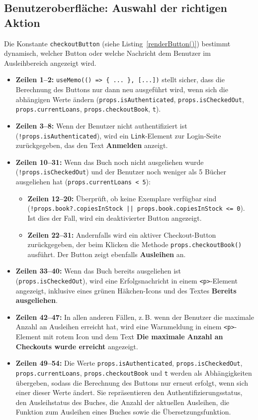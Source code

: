 \subsection*{Benutzeroberfläche: Auswahl der richtigen Aktion}

Die Konstante \texttt{checkoutButton} (siehe Listing~\ref{renderButton()}) bestimmt dynamisch, welcher Button oder welche Nachricht dem Benutzer im Ausleihbereich angezeigt wird. 

\begin{itemize}
	\item \textbf{Zeilen 1--2:} \texttt{useMemo(() => \{ ... \}, [...])} stellt sicher, dass die Berechnung des Buttons nur dann neu ausgeführt wird, wenn sich die abhängigen Werte ändern (\texttt{props.isAuthenticated}, \texttt{props.isCheckedOut}, \texttt{props.currentLoans}, \texttt{props.checkoutBook}, \texttt{t}).
	\item \textbf{Zeilen 3--8:} Wenn der Benutzer nicht authentifiziert ist (\texttt{!props.isAuthenticated}), wird ein \texttt{Link}-Element zur Login-Seite zurückgegeben, das den Text \textbf{Anmelden} anzeigt.
	\item \textbf{Zeilen 10--31:} Wenn das Buch noch nicht ausgeliehen wurde (\texttt{!props.isCheckedOut}) und der Benutzer noch weniger als 5 Bücher ausgeliehen hat (\texttt{props.currentLoans < 5}):
	\begin{itemize}
		\item \textbf{Zeilen 12--20:} Überprüft, ob keine Exemplare verfügbar sind (\texttt{!props.book?.copiesInStock || props.book.copiesInStock <= 0}). Ist dies der Fall, wird ein deaktivierter Button angezeigt.
		\item \textbf{Zeilen 22--31:} Andernfalls wird ein aktiver Checkout-Button zurückgegeben, der beim Klicken die Methode \texttt{props.checkoutBook()} ausführt. Der Button zeigt ebenfalls \textbf{Ausleihen} an.
	\end{itemize}
	\item \textbf{Zeilen 33--40:} Wenn das Buch bereits ausgeliehen ist (\texttt{props.isCheckedOut}), wird eine Erfolgsnachricht in einem \texttt{<p>}-Element angezeigt, inklusive eines grünen Häkchen-Icons und des Textes \textbf{Bereits ausgeliehen}.
	\item \textbf{Zeilen 42--47:} In allen anderen Fällen, z.\,B. wenn der Benutzer die maximale Anzahl an Ausleihen erreicht hat, wird eine Warnmeldung in einem \texttt{<p>}-Element mit rotem Icon und dem Text \textbf{Die maximale Anzahl an Checkouts wurde erreicht} angezeigt.
	\item \textbf{Zeilen 49--54:} Die Werte \texttt{props.isAuthenticated}, \texttt{props.isCheckedOut}, \texttt{props.currentLoans}, \texttt{props.checkoutBook} und \texttt{t} werden als Abhängigkeiten übergeben, sodass die Berechnung des Buttons nur erneut erfolgt, wenn sich einer dieser Werte ändert. Sie repräsentieren den Authentifizierungsstatus, den Ausleihstatus des Buches, die Anzahl der aktuellen Ausleihen, die Funktion zum Ausleihen eines Buches sowie die Übersetzungsfunktion.
\end{itemize}

